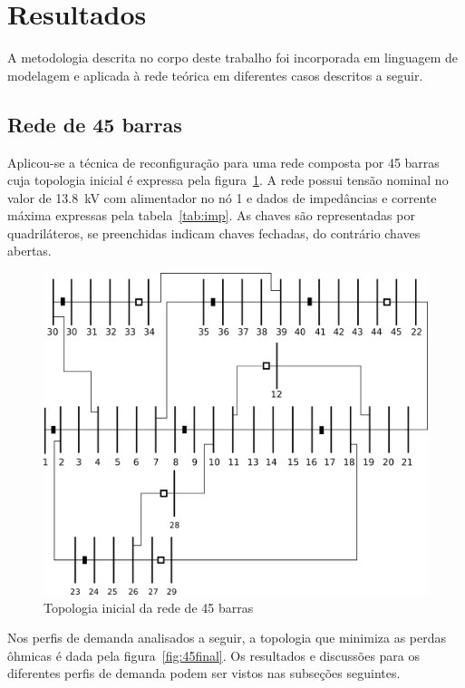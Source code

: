 \section{Resultados}

A metodologia descrita no corpo deste trabalho foi incorporada em linguagem de modelagem e aplicada à rede teórica em diferentes casos descritos a seguir.

\subsection{Rede de 45 barras}

Aplicou-se a técnica de reconfiguração para uma rede composta por 45 barras cuja topologia inicial é expressa pela figura~\ref{fig:45inicial}.
A rede possui tensão nominal no valor de \SI{13.8}{\kilo\volt} com alimentador no nó 1 e dados de impedâncias e corrente máxima expressas pela tabela~\ref{tab:imp}.
As chaves são representadas por quadriláteros, se preenchidas indicam chaves fechadas, do contrário chaves abertas.



\begin{figure}[H]
    \centering
    \includegraphics[width=0.6  \textwidth]{7_Results/img/rede_inicial.png}
    \caption{Topologia inicial da rede de 45 barras}
    \label{fig:45inicial}
\end{figure}



Nos perfis de demanda analisados a seguir, a topologia que minimiza as perdas ôhmicas é dada pela figura~\ref{fig:45final}.
Os resultados e discussões para os diferentes perfis de demanda podem ser vistos nas subseções seguintes.

